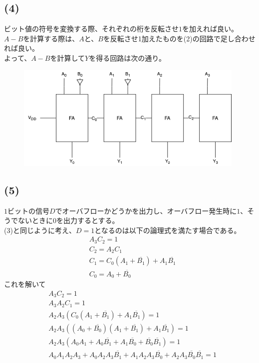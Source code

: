 \documentclass[a4paper,12pt,xelatex,ja=standard]{bxjsarticle}
\begin{document}
  \subsection*{(4)}
  ビット値の符号を変換する際、それぞれの桁を反転させ$1$を加えれば良い。$A-B$を計算する際は、$A$と、$B$を反転させ1加えたものを(2)の回路で足し合わせれば良い。\\
  よって、$A-B$を計算して$Y$を得る回路は次の通り。
  \begin{figure}[H]
    \centering
    \includegraphics[width=11cm]{images/ripple_carry_subtractor.png}
  \end{figure}

  \subsection*{(5)}
  $1$ビットの信号$D$でオーバフローかどうかを出力し、オーバフロー発生時に$1$、そうでないときに$0$を出力するとする。\\
  (3)と同じように考え、$D=1$となるのは以下の論理式を満たす場合である。
  \begin{equation*}
    \begin{split}
      &A_3 C_2 = 1 \\
      &C_2 = A_2 C_1 \\
      &C_1 = C_0 (A_1 + \overline{B_1}) + A_1 \overline{B_1} \\
      &C_0 = A_0 + \overline{B_0}
    \end{split}
  \end{equation*}
  これを解いて
  \begin{equation*}
    \begin{split}
      &A_3 C_2 = 1 \\
      &A_3 A_2 C_1 = 1 \\
      &A_2 A_3 (C_0(A_1 + \overline{B_1}) + A_1 \overline{B_1}) = 1 \\
      &A_2 A_3 ((A_0 + \overline{B_0})(A_1 + \overline{B_1}) + A_1 \overline{B_1}) = 1 \\
      &A_2 A_3 (A_0A_1 + A_0 \overline{B_1} + A_1\overline{B_0} + \overline{B_0} \overline{B_1}) = 1 \\
      &A_0A_1A_2A_3 + A_0A_2A_3\overline{B_1} + A_1A_2A_3\overline{B_0} + A_2A_3\overline{B_0}\overline{B_1} = 1 \\
    \end{split}
  \end{equation*}
\end{document}
